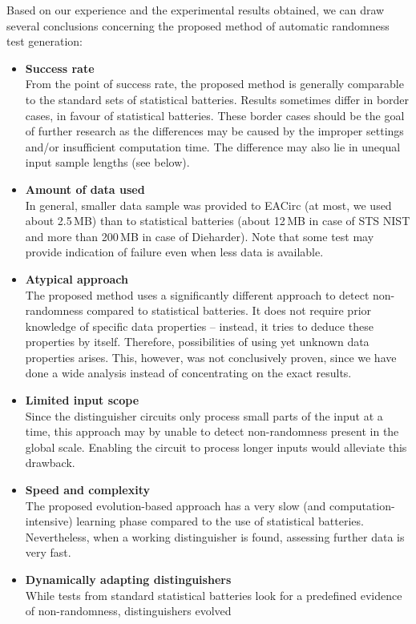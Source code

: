 \documentclass[12pt,oneside]{fithesis2}		%
\renewcommand{\_}{\leavevmode \kern0.0em\vbox{\hrule width0.4em}}
\newcommand{\squarebullet}{\textcolor{black}{\raisebox{0.15em}{\rule{4pt}{4pt}}}}
\newenvironment{myItemize}{
  \begin{itemize}[leftmargin=2em,rightmargin=1em,itemsep=\parskip ,parsep=0em,topsep=0em,partopsep=0em]
  \renewcommand{\labelitemi}{\squarebullet}
  \renewcommand{\labelitemii}{$\diamond$}
}{
  \end{itemize}
}
\begin{document}
Based on our experience and the experimental results obtained, we can draw several conclusions concerning the proposed
method of automatic randomness test generation:
\begin{myItemize}
\item \textbf{Success rate}\\
From the point of success rate, the proposed method is generally comparable to the standard sets of statistical batteries.
Results sometimes differ in border cases, in favour of statistical batteries.
These border cases should be the goal of further research as the differences may
be caused by the improper settings and/or insufficient computation time. The difference may also lie in unequal input sample lengths
(see below).
\item \textbf{Amount of data used}\\
In general, smaller data sample was provided to EACirc (at most, we used about 2.5\,MB) than to statistical batteries
(about 12\,MB in case of STS NIST and more than 200\,MB in case of Dieharder). Note that some test may provide indication
of failure even when less data is available.
\item \textbf{Atypical approach}\\
The proposed method uses a significantly different approach to detect non-randomness compared to statistical batteries.
It does not require prior knowledge of specific data properties -- instead, it tries to deduce these properties by itself.
Therefore, possibilities of using yet unknown data properties arises. This, however, was not conclusively proven, 
since we have done a wide analysis instead of concentrating on the exact results.
\item \textbf{Limited input scope}\\
Since the distinguisher circuits only process small parts of the input at a time, this approach may by unable to detect
non-randomness present in the global scale. Enabling the circuit to process longer inputs would alleviate this drawback.
\item \textbf{Speed and complexity}\\
The proposed evolution-based approach has a very slow (and computation-intensive) 
learning phase compared to the use of statistical batteries.
Nevertheless, when a working distinguisher is found, assessing further data is very fast.
\item \textbf{Dynamically adapting distinguishers}\\
While tests from standard statistical batteries look for a predefined evidence of non-randomness, distinguishers evolved

\end{myItemize}
\end{document}
